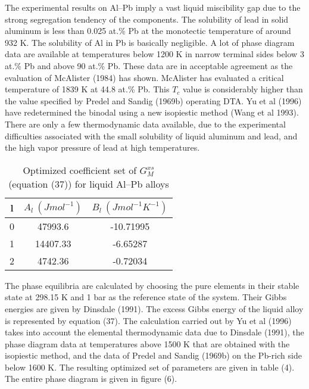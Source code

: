 \documentclass[12pt]{article}
\newcommand*{\1}{\hspace{1pt}}
\begin{document}
The experimental results on Al–Pb imply a vast liquid
miscibility gap due to the strong segregation tendency of the components. The solubility of
lead in solid aluminum is less than 0.025 at.\% Pb at the monotectic temperature of around
932 K. The solubility of Al in Pb is basically negligible. A lot of phase diagram data are
available at temperatures below 1200 K in narrow terminal sides below 3 at.\% Pb and above 90 
at.\% Pb. These data are in acceptable agreement as the evaluation of McAlister (1984) has 
shown. McAlister has evaluated a critical temperature of 1839 K at 44.8 at.\% Pb. This $T _c$
value is considerably higher than the value specified by Predel and Sandig (1969b) operating
DTA. Yu et al (1996) have redetermined the binodal using a new isopiestic method (Wang et al 
1993). There are only a few thermodynamic data available, due to the experimental
difficulties associated with the small solubility of liquid aluminum and lead, and the high
vapor pressure of lead at high temperatures.\\ 
\begin{table}[t!]
    \centering
    \caption{Optimized coefficient set of $G ^ {xs} _ {M}$ 
    (equation (37)) for liquid Al–Pb alloys}
     \begin{tabular}{|c | c | c|} 
     \hline
     l & $A_l \ (J mol^{-1})$ & $B_l \ (J mol^{-1}K^{-1})$ \\ [0.5ex] 
     \hline\hline
     0 & 47993.6 & -10.71995  \\ 
     1 & 14407.33 & -6.65287  \\
     2 & 4742.36 & -0.72034  \\ [1ex] 
     \hline
     \end{tabular}
    \end{table}

The phase equilibria are calculated by choosing the pure elements in their stable state at 
298.15 K and 1 bar as the reference state of the system. Their Gibbs energies are given by 
Dinsdale (1991). The excess Gibbs energy of the liquid alloy is represented by equation (37). 
The calculation carried out by Yu et al (1996) takes into account the elemental thermodynamic 
data due to Dinsdale (1991), the phase diagram data at
temperatures above 1500 K that are obtained with the isopiestic method, and the data of Predel 
and Sandig (1969b) on the Pb-rich side below 1600 K. The resulting optimized set of parameters 
are given in table (4). The entire phase diagram is given in figure (6). 

\begin{adjustbox}{center,caption={Calculated phase diagram (continuous curve) using the 
    coefficient set given in table 3.},label={somelabel},nofloat=figure,vspace=\bigskipamount}
\end{adjustbox}
\end{document}
